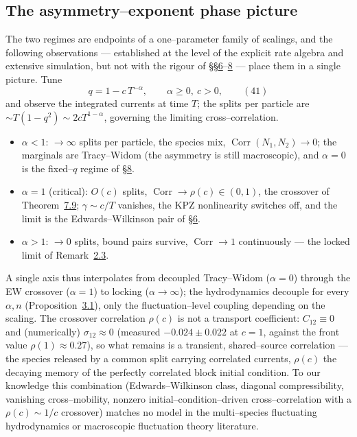 \documentclass[11pt]{article}
\theoremstyle{plain}
\theoremstyle{definition}
\theoremstyle{remark}
\DeclareMathOperator{\Corr}{Corr}\DeclareMathOperator{\cum}{cum}
\begin{document}
\subsection{The asymmetry--exponent phase picture}\label{sec_phase}

The two regimes are endpoints of a one--parameter family of scalings, and the
following observations --- established at the level of the explicit rate algebra and
extensive simulation, but not with the rigour of \S\S\hyperref[sec_ew]{6}--\hyperref[sec_tw]{8} --- place
them in a single picture. Tune
\label{eq_alpha}
\begin{equation}
  q=1-c\,T^{-\alpha},\qquad \alpha\ge0,\ c>0,\qquad(41)
\end{equation}
and observe the integrated currents at time $T$; the splits per particle are
$\sim T(1-q^2)\sim2cT^{1-\alpha}$, governing the limiting cross--correlation.

\begin{itemize}
\item $\alpha<1$: $\to\infty$ splits per particle, the species mix,
$\Corr(N_1,N_2)\to0$; the marginals are Tracy--Widom (the asymmetry is still
macroscopic), and $\alpha=0$ is the fixed--$q$ regime of \S\hyperref[sec_tw]{8}.
\item $\alpha=1$ (critical): $O(c)$ splits, $\Corr\to\rho(c)\in(0,1)$, the crossover of
Theorem~\hyperref[thm_closed]{7.9}; $\gamma\sim c/T$ vanishes, the KPZ nonlinearity switches off,
and the limit is the Edwards--Wilkinson pair of \S\hyperref[sec_ew]{6}.
\item $\alpha>1$: $\to0$ splits, bound pairs survive, $\Corr\to1$ continuously --- the
locked limit of Remark~\hyperref[rem_range]{2.3}.
\end{itemize}

\noindent A single axis thus interpolates from decoupled Tracy--Widom ($\alpha=0$)
through the EW crossover ($\alpha=1$) to locking ($\alpha\to\infty$); the hydrodynamics
decouple for every $\alpha,n$ (Proposition~\hyperref[prop_decouple]{3.1}), only the
fluctuation--level coupling depending on the scaling. The crossover correlation
$\rho(c)$ is not a transport coefficient: $C_{12}\equiv0$ and (numerically)
$\sigma_{12}\approx0$ (measured $-0.024\pm0.022$ at $c=1$, against the front value
$\rho(1)\approx0.27$), so what remains is a transient, shared--source correlation --- the
species released by a common split carrying correlated currents, $\rho(c)$ the decaying
memory of the perfectly correlated block initial condition. To our knowledge this
combination (Edwards--Wilkinson class, diagonal compressibility, vanishing
cross--mobility, nonzero initial--condition--driven cross--correlation with a
$\rho(c)\sim1/c$ crossover) matches no model in the multi--species fluctuating
hydrodynamics or macroscopic fluctuation theory literature.
\end{document}
